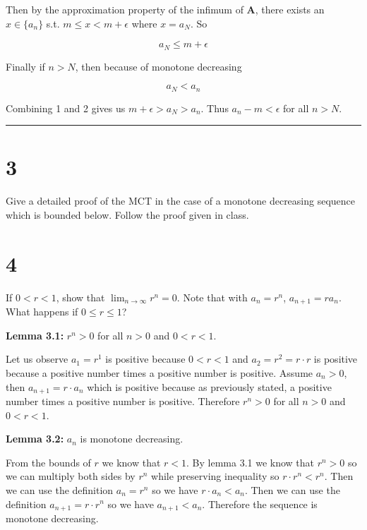 \documentclass[10pt,letterpaper]{article}
\newcommand\A{\mathbf{A}}
\newcommand\ds{\displaystyle}
\newcommand\qedsym{\hfill \rule{2mm}{2mm}}
\begin{document}
Then by the approximation property of the infimum of $\A$, there exists an $x \in \{a_n\}$ s.t. $m \leq x < m + \epsilon$ where $x = a_N$. So

\begin{equation}
a_N \leq m + \epsilon
\end{equation}

Finally if $n>N$, then because of monotone decreasing

\begin{equation}
a_N < a_n
\end{equation}

Combining 1 and 2 gives us $m + \epsilon > a_N > a_n$.
Thus $a_n - m < \epsilon$ for all $n > N$.

\qedsym{}

\section*{3} Give a detailed proof of the MCT in the case of a monotone decreasing sequence which is bounded below. Follow the proof given in class.

\section*{4} If $0 < r < 1$, show that $\ds \lim_{n \to \infty} r^n= 0$. Note that with $a_n = r^n$, $a_{n+1} = r a_n$. What happens if $0 \leq r \leq 1$?

\medskip

\textbf{Lemma 3.1:} $r^n > 0$ for all $n > 0$ and $0 < r < 1$.

Let us observe $a_1 = r^1$ is positive because $0 < r < 1$ and $a_2 = r^2 = r\cdot r$ is positive because a positive number times a positive number is positive. Assume $a_n > 0$, then $a_{n+1} = r\cdot a_n$ which is positive because as previously stated, a positive number times a positive number is positive. Therefore $r^n > 0$ for all $n > 0$ and $0 < r < 1$.

\medskip

\textbf{Lemma 3.2:} $a_n$ is monotone decreasing.

From the bounds of $r$ we know that $r<1$. By lemma 3.1 we know that $r^n > 0$ so we can multiply both sides by $r^n$ while preserving inequality so $r\cdot r^n < r^n$. Then we can use the definition $a_n = r^n$ so we have $r\cdot a_n < a_n$. Then we can use the definition $a_{n+1} = r\cdot r^n$ so we have $a_{n+1} < a_n$. Therefore the sequence is monotone decreasing.
\end{document}
